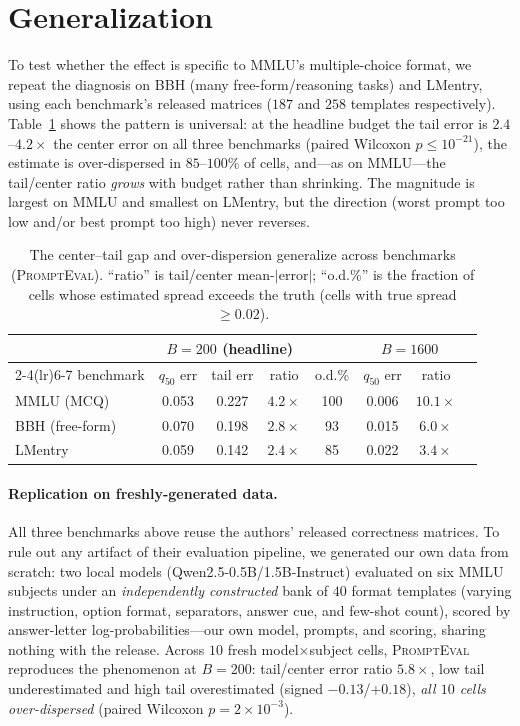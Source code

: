 \documentclass[11pt]{article}
\newcommand{\pe}{\textsc{PromptEval}}
\begin{document}
\section{Generalization}\label{sec:gen}
To test whether the effect is specific to MMLU's multiple-choice format, we repeat the
diagnosis on BBH (many free-form/reasoning tasks) and LMentry, using each benchmark's released
matrices ($187$ and $258$ templates respectively). Table~\ref{tab:gen} shows the pattern is
universal: at the headline budget the tail error is $2.4$--$4.2\times$ the center error on all
three benchmarks (paired Wilcoxon $p\le10^{-21}$), the estimate is over-dispersed in
$85$--$100\%$ of cells, and---as on MMLU---the tail/center ratio \emph{grows} with budget
rather than shrinking. The magnitude is largest on MMLU and smallest on LMentry, but the
direction (worst prompt too low and/or best prompt too high) never reverses.

\begin{table}[h]\centering\small
\caption{The center--tail gap and over-dispersion generalize across benchmarks (\pe{}).
``ratio'' is tail/center mean-$|$error$|$; ``o.d.\%'' is the fraction of cells whose estimated
spread exceeds the truth (cells with true spread $\ge0.02$).}
\label{tab:gen}
\begin{tabular}{lccccccc}
\toprule
& \multicolumn{3}{c}{$B{=}200$ (headline)} & & \multicolumn{2}{c}{$B{=}1600$} \\
\cmidrule(lr){2-4}\cmidrule(lr){6-7}
benchmark & $q_{50}$ err & tail err & ratio & o.d.\% & $q_{50}$ err & ratio \\
\midrule
MMLU (MCQ)        & 0.053 & 0.227 & $4.2\times$ & 100 & 0.006 & $10.1\times$ \\
BBH (free-form)   & 0.070 & 0.198 & $2.8\times$ & 93  & 0.015 & $6.0\times$ \\
LMentry           & 0.059 & 0.142 & $2.4\times$ & 85  & 0.022 & $3.4\times$ \\
\bottomrule
\end{tabular}
\end{table}

\paragraph{Replication on freshly-generated data.} All three benchmarks above reuse the
authors' released correctness matrices. To rule out any artifact of their evaluation pipeline,
we generated our own data from scratch: two local models (Qwen2.5-0.5B/1.5B-Instruct) evaluated
on six MMLU subjects under an \emph{independently constructed} bank of $40$ format templates
(varying instruction, option format, separators, answer cue, and few-shot count), scored by
answer-letter log-probabilities---our own model, prompts, and scoring, sharing nothing with the
release. Across $10$ fresh model$\times$subject cells, \pe{} reproduces the phenomenon at
$B{=}200$: tail/center error ratio $\mathbf{5.8\times}$, low tail underestimated and high tail
overestimated (signed $-0.13$/$+0.18$), \emph{all $10$ cells over-dispersed} (paired Wilcoxon
$p=2\times10^{-3}$).
\end{document}
